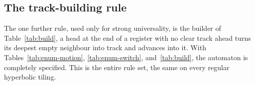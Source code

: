 \subsection{The track-building rule}

The one further rule, used only for strong universality, is the builder of Table~\ref{tab:build}, a head at the
end of a register with no clear track ahead turns its deepest empty neighbour into track and advances into it.
With Tables~\ref{tab:enum-motion}, \ref{tab:enum-switch}, and~\ref{tab:build}, the automaton is completely
specified. This is the entire rule set, the same on every regular hyperbolic tiling.
